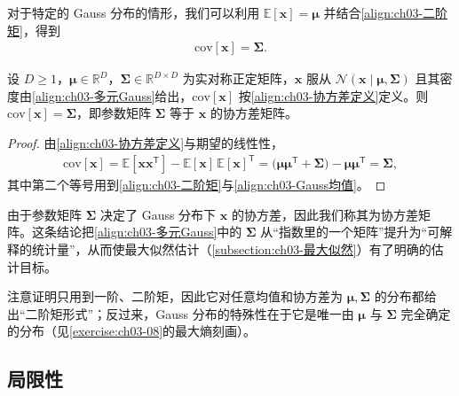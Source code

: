 \documentclass[../../main.tex]{subfiles}
\begin{document}
对于特定的 Gauss 分布的情形，我们可以利用 $\mathbb{E}[\boldsymbol{x}]=\boldsymbol{\mu}$ 并结合\eqref{align:ch03-二阶矩}，得到
\begin{align}
\mathrm{cov}[\boldsymbol{x}]=\boldsymbol{\Sigma}.
\label{align:ch03-Gauss协方差}
\end{align}

\begin{proposition}\label{proposition:ch03-Gauss协方差}
设 $D\geqslant1$，$\boldsymbol{\mu}\in\mathbb{R}^{D}$，$\boldsymbol{\Sigma}\in\mathbb{R}^{D\times D}$ 为实对称正定矩阵，$\boldsymbol{x}$ 服从 $\mathcal{N}(\boldsymbol{x}\mid\boldsymbol{\mu},\boldsymbol{\Sigma})$ 且其密度由\eqref{align:ch03-多元Gauss}给出，$\mathrm{cov}[\boldsymbol{x}]$ 按\eqref{align:ch03-协方差定义}定义。则 $\mathrm{cov}[\boldsymbol{x}]=\boldsymbol{\Sigma}$，即参数矩阵 $\boldsymbol{\Sigma}$ 等于 $\boldsymbol{x}$ 的协方差矩阵。
\end{proposition}
\begin{proof}
由\eqref{align:ch03-协方差定义}与期望的线性性，
\begin{align*}
\mathrm{cov}[\boldsymbol{x}]=\mathbb{E}[\boldsymbol{x}\boldsymbol{x}^{\mathsf{T}}]-\mathbb{E}[\boldsymbol{x}]\,\mathbb{E}[\boldsymbol{x}]^{\mathsf{T}}=\bigl(\boldsymbol{\mu}\boldsymbol{\mu}^{\mathsf{T}}+\boldsymbol{\Sigma}\bigr)-\boldsymbol{\mu}\boldsymbol{\mu}^{\mathsf{T}}=\boldsymbol{\Sigma},
\end{align*}
其中第二个等号用到\eqref{align:ch03-二阶矩}与\eqref{align:ch03-Gauss均值}。
\end{proof}

\begin{remark}
由于参数矩阵 $\boldsymbol{\Sigma}$ 决定了 Gauss 分布下 $\boldsymbol{x}$ 的协方差，因此我们称其为协方差矩阵。这条结论把\eqref{align:ch03-多元Gauss}中的 $\boldsymbol{\Sigma}$ 从“指数里的一个矩阵”提升为“可解释的统计量”，从而使最大似然估计（\cref{subsection:ch03-最大似然}）有了明确的估计目标。

注意证明只用到一阶、二阶矩，因此它对任意均值和协方差为 $\boldsymbol{\mu},\boldsymbol{\Sigma}$ 的分布都给出“二阶矩形式”；反过来，Gauss 分布的特殊性在于它是唯一由 $\boldsymbol{\mu}$ 与 $\boldsymbol{\Sigma}$ 完全确定的分布（见\cref{exercise:ch03-08}的最大熵刻画）。
\end{remark}

\subsection{局限性}\label{subsection:ch03-局限性}
\end{document}
